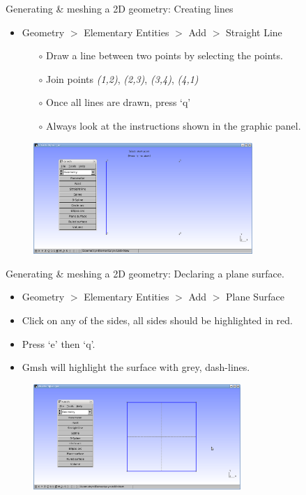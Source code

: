 \documentclass[t]{beamer}
\begin{document}
\begin{frame}{Generating \& meshing a 2D geometry: Creating lines}
\begin{itemize}
\item Geometry $>$ Elementary Entities $>$ Add $>$ Straight Line
\begin{itemize}
\item[$\circ$] Draw a line between two points by selecting the points.
\item[$\circ$] Join points \emph{(1,2)}, \emph{(2,3)}, \emph{(3,4)}, \emph{(4,1)}
\item[$\circ$] Once all lines are drawn, press `q'
\item[$\circ$] Always look at the instructions shown in the graphic panel.
\end{itemize}
\end{itemize}
\begin{figure}[htbp]
 \centering
  \includegraphics[width=0.74\textwidth]{../figures/Gmsh_dawing_lines.png}
\end{figure}
\end{frame}

\begin{frame}{Generating \& meshing a 2D geometry: Declaring a plane surface.}
\begin{itemize}
\item Geometry $>$ Elementary Entities $>$ Add $>$ Plane Surface
\item Click on any of the sides, all sides should be highlighted in red.
\item Press `e' then `q'.
\item Gmsh will highlight the surface with grey, dash-lines.
\end{itemize}
\begin{figure}[htbp]
 \centering
  \includegraphics[width=0.7\textwidth]{../figures/2d-example-surface}
\end{figure}
\end{frame}
\end{document}
